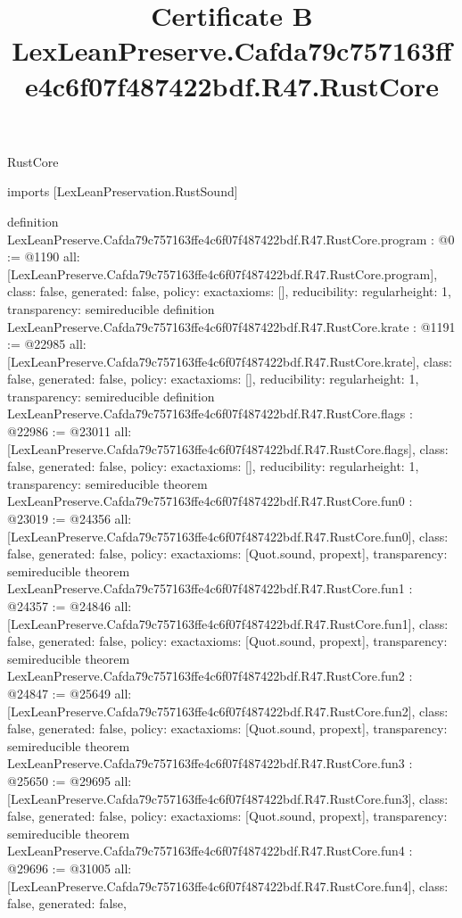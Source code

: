 \begin{lexlean}{RustCore}
\title{Certificate B LexLeanPreserve.Cafda79c757163ffe4c6f07f487422bdf.R47.RustCore}
\begin{coremodule}
imports [LexLeanPreservation.RustSound]

definition LexLeanPreserve.Cafda79c757163ffe4c6f07f487422bdf.R47.RustCore.program : @0 := @1190 {
  all: [LexLeanPreserve.Cafda79c757163ffe4c6f07f487422bdf.R47.RustCore.program],
  class: false,
  generated: false,
  policy: exact{axioms: []},
  reducibility: regular{height: 1},
  transparency: semireducible
}
definition LexLeanPreserve.Cafda79c757163ffe4c6f07f487422bdf.R47.RustCore.krate : @1191 := @22985 {
  all: [LexLeanPreserve.Cafda79c757163ffe4c6f07f487422bdf.R47.RustCore.krate],
  class: false,
  generated: false,
  policy: exact{axioms: []},
  reducibility: regular{height: 1},
  transparency: semireducible
}
definition LexLeanPreserve.Cafda79c757163ffe4c6f07f487422bdf.R47.RustCore.flags : @22986 := @23011 {
  all: [LexLeanPreserve.Cafda79c757163ffe4c6f07f487422bdf.R47.RustCore.flags],
  class: false,
  generated: false,
  policy: exact{axioms: []},
  reducibility: regular{height: 1},
  transparency: semireducible
}
theorem LexLeanPreserve.Cafda79c757163ffe4c6f07f487422bdf.R47.RustCore.fun0 : @23019 := @24356 {
  all: [LexLeanPreserve.Cafda79c757163ffe4c6f07f487422bdf.R47.RustCore.fun0],
  class: false,
  generated: false,
  policy: exact{axioms: [Quot.sound, propext]},
  transparency: semireducible
}
theorem LexLeanPreserve.Cafda79c757163ffe4c6f07f487422bdf.R47.RustCore.fun1 : @24357 := @24846 {
  all: [LexLeanPreserve.Cafda79c757163ffe4c6f07f487422bdf.R47.RustCore.fun1],
  class: false,
  generated: false,
  policy: exact{axioms: [Quot.sound, propext]},
  transparency: semireducible
}
theorem LexLeanPreserve.Cafda79c757163ffe4c6f07f487422bdf.R47.RustCore.fun2 : @24847 := @25649 {
  all: [LexLeanPreserve.Cafda79c757163ffe4c6f07f487422bdf.R47.RustCore.fun2],
  class: false,
  generated: false,
  policy: exact{axioms: [Quot.sound, propext]},
  transparency: semireducible
}
theorem LexLeanPreserve.Cafda79c757163ffe4c6f07f487422bdf.R47.RustCore.fun3 : @25650 := @29695 {
  all: [LexLeanPreserve.Cafda79c757163ffe4c6f07f487422bdf.R47.RustCore.fun3],
  class: false,
  generated: false,
  policy: exact{axioms: [Quot.sound, propext]},
  transparency: semireducible
}
theorem LexLeanPreserve.Cafda79c757163ffe4c6f07f487422bdf.R47.RustCore.fun4 : @29696 := @31005 {
  all: [LexLeanPreserve.Cafda79c757163ffe4c6f07f487422bdf.R47.RustCore.fun4],
  class: false,
  generated: false,
}
\end{coremodule}
\end{lexlean}

